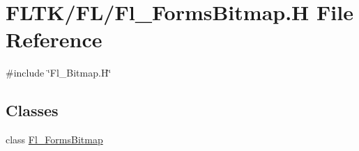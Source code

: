 \hypertarget{_fl___forms_bitmap_8_h}{}\section{F\+L\+T\+K/\+F\+L/\+Fl\+\_\+\+Forms\+Bitmap.H File Reference}
\label{_fl___forms_bitmap_8_h}
{\ttfamily \#include \char`\"{}Fl\+\_\+\+Bitmap.\+H\char`\"{}}\newline
\subsection*{Classes}
\begin{DoxyCompactItemize}
\item 
class \hyperlink{class_fl___forms_bitmap}{Fl\+\_\+\+Forms\+Bitmap}
\end{DoxyCompactItemize}
